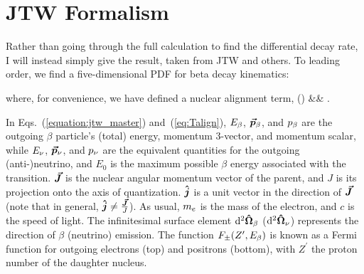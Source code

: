\section[JTW Formalism]{JTW Formalism}
\label{sec:jtw_formalism}
Rather than going through the full calculation to find the differential decay rate, I will instead simply give the result, taken from \ac{JTW} and others\cite{LeeYang}\cite{jtw}\cite{jtw_coulomb}\cite{EbelFeldman1957}.  To leading order, we find a five-dimensional \ac{PDF} for beta decay kinematics:  
%
%
%
%
%

where, for convenience, we have defined a nuclear alignment term,
\bea
\Talign(\vecJ) &\equiv& \TalignExpand.
\label{eq:Talign}
\eea
{}

In Eqs.~(\ref{equation:jtw_master}) and~(\ref{eq:Talign}), $E_{\beta}$, $\bm{\vec{p}}_{\beta}$, and $p_{\beta}$ are the outgoing $\beta$ particle's (total) energy, momentum 3-vector, and momentum scalar, while $E_{\nu}$, $\bm{\vec{p}}_{\nu}$, and $p_{\nu}$ are the equivalent quantities for the outgoing (anti-)neutrino, and $E_0$ is the maximum possible $\beta$ energy associated with the transition.   $\bm{\vec{J}}$ is the nuclear angular momentum vector of the parent, and $J$ is its projection onto the axis of quantization. $\bm{\hat{j}}$ is a unit vector in the direction of $\bm{\vec{J}}$ (note that in general, $\bm{\hat{j}} \neq \frac{\bm{\vec{J}}}{J}$).  As usual, $m_e$ is the mass of the electron, and $c$ is the speed of light.  The infinitesimal surface element $\mathrm{d}^{2} \bm{\hat{\Omega}}_\beta$ ($\mathrm{d}^{2} \bm{\hat{\Omega}}_\nu$) represents the direction of $\beta$ (neutrino) emission.  The function $F_{\pm}(Z^\prime, E_\beta)$ is known as a Fermi function for outgoing electrons (top) and positrons (bottom), with $Z^\prime$ the proton number of the daughter nucleus.

